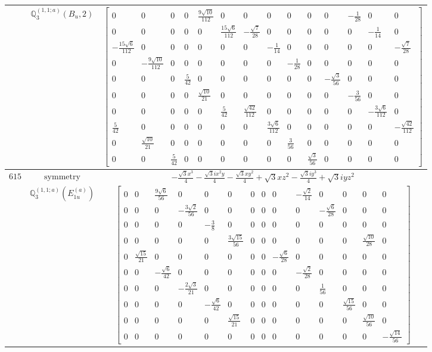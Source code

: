 \documentclass[fleqn,8pt,landscape]{jsarticle}
\begin{document}
\begin{longtable}{ccc}
$  $ & $ \mathbb{Q}_{3}^{(1,1;a)}(B_{u},2) $ & $ \begin{bmatrix} 0 & 0 & 0 & 0 & \frac{9 \sqrt{10}}{112} & 0 & 0 & 0 & 0 & 0 & 0 & - \frac{1}{28} & 0 & 0 \\ 0 & 0 & 0 & 0 & 0 & \frac{15 \sqrt{6}}{112} & - \frac{\sqrt{7}}{28} & 0 & 0 & 0 & 0 & 0 & - \frac{1}{14} & 0 \\ - \frac{15 \sqrt{6}}{112} & 0 & 0 & 0 & 0 & 0 & 0 & - \frac{1}{14} & 0 & 0 & 0 & 0 & 0 & - \frac{\sqrt{7}}{28} \\ 0 & - \frac{9 \sqrt{10}}{112} & 0 & 0 & 0 & 0 & 0 & 0 & - \frac{1}{28} & 0 & 0 & 0 & 0 & 0 \\ 0 & 0 & 0 & \frac{5}{42} & 0 & 0 & 0 & 0 & 0 & 0 & - \frac{\sqrt{3}}{56} & 0 & 0 & 0 \\ 0 & 0 & 0 & 0 & \frac{\sqrt{10}}{21} & 0 & 0 & 0 & 0 & 0 & 0 & - \frac{3}{56} & 0 & 0 \\ 0 & 0 & 0 & 0 & 0 & \frac{5}{42} & \frac{\sqrt{42}}{112} & 0 & 0 & 0 & 0 & 0 & - \frac{3 \sqrt{6}}{112} & 0 \\ \frac{5}{42} & 0 & 0 & 0 & 0 & 0 & 0 & \frac{3 \sqrt{6}}{112} & 0 & 0 & 0 & 0 & 0 & - \frac{\sqrt{42}}{112} \\ 0 & \frac{\sqrt{10}}{21} & 0 & 0 & 0 & 0 & 0 & 0 & \frac{3}{56} & 0 & 0 & 0 & 0 & 0 \\ 0 & 0 & \frac{5}{42} & 0 & 0 & 0 & 0 & 0 & 0 & \frac{\sqrt{3}}{56} & 0 & 0 & 0 & 0 \end{bmatrix} $ \\ \hline
$ 615 $ & $ \text{symmetry} $ & $ - \frac{\sqrt{3} x^{3}}{4} - \frac{\sqrt{3} i x^{2} y}{4} - \frac{\sqrt{3} x y^{2}}{4} + \sqrt{3} x z^{2} - \frac{\sqrt{3} i y^{3}}{4} + \sqrt{3} i y z^{2} $ \\
$  $ & $ \mathbb{Q}_{3}^{(1,1;a)}(E_{1u}^{(a)}) $ & $ \begin{bmatrix} 0 & 0 & \frac{9 \sqrt{6}}{56} & 0 & 0 & 0 & 0 & 0 & 0 & - \frac{\sqrt{2}}{14} & 0 & 0 & 0 & 0 \\ 0 & 0 & 0 & - \frac{3 \sqrt{2}}{56} & 0 & 0 & 0 & 0 & 0 & 0 & - \frac{\sqrt{6}}{28} & 0 & 0 & 0 \\ 0 & 0 & 0 & 0 & - \frac{3}{8} & 0 & 0 & 0 & 0 & 0 & 0 & 0 & 0 & 0 \\ 0 & 0 & 0 & 0 & 0 & \frac{3 \sqrt{15}}{56} & 0 & 0 & 0 & 0 & 0 & 0 & \frac{\sqrt{10}}{28} & 0 \\ 0 & \frac{\sqrt{15}}{21} & 0 & 0 & 0 & 0 & 0 & 0 & - \frac{\sqrt{6}}{28} & 0 & 0 & 0 & 0 & 0 \\ 0 & 0 & - \frac{\sqrt{6}}{42} & 0 & 0 & 0 & 0 & 0 & 0 & - \frac{\sqrt{2}}{28} & 0 & 0 & 0 & 0 \\ 0 & 0 & 0 & - \frac{2 \sqrt{3}}{21} & 0 & 0 & 0 & 0 & 0 & 0 & \frac{1}{56} & 0 & 0 & 0 \\ 0 & 0 & 0 & 0 & - \frac{\sqrt{6}}{42} & 0 & 0 & 0 & 0 & 0 & 0 & \frac{\sqrt{15}}{56} & 0 & 0 \\ 0 & 0 & 0 & 0 & 0 & \frac{\sqrt{15}}{21} & 0 & 0 & 0 & 0 & 0 & 0 & \frac{\sqrt{10}}{56} & 0 \\ 0 & 0 & 0 & 0 & 0 & 0 & 0 & 0 & 0 & 0 & 0 & 0 & 0 & - \frac{\sqrt{14}}{56} \end{bmatrix} $ \\ \hline

\end{longtable}
\end{document}
